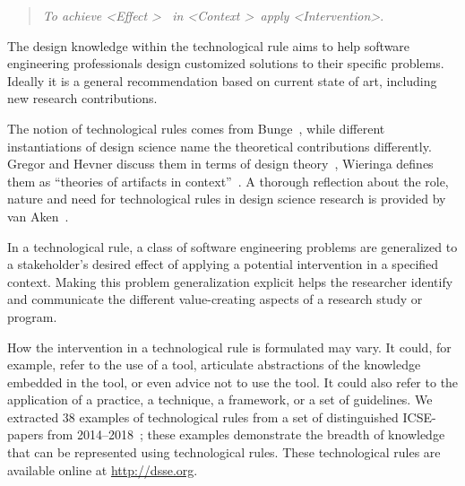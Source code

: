 \documentclass[graybox]{svmult}
\newcommand{\emelie}[1]{\textcolor{red}{{\it [Emelie says: #1]}}}
\newcommand{\peggy}[1]{\textcolor{blue}{{\it [Peggy says: #1]}}}
\newcommand{\per}[1]{\textcolor{cyan}{{\it [Per says: #1]}}}
\newcommand{\emelie}[1]{}
\newcommand{\peggy}[1]{}
\newcommand{\per}[1]{}
\begin{document}
\begin{quote}{\emph{To achieve \textless Effect \textgreater ~ in \textless Context \textgreater~apply \textless Intervention\textgreater}.} 
\end{quote}
The design knowledge within the technological rule aims to help software engineering professionals design customized solutions to their specific problems. Ideally it is a general recommendation based on current state of art, including new research contributions.

The notion of technological rules comes from Bunge~\cite{bunge_philosophy_1998}, while different instantiations of design science name the theoretical contributions differently. Gregor and Hevner discuss them in terms of design theory~\cite{gregor_positioning_2013}, Wieringa defines them as ``theories of artifacts in context''~\cite{wieringa_design_2009}. A thorough reflection about the role, nature and need for  technological rules in design science research is provided by van Aken~\cite{van_aken_management_2004}. 

In a technological rule, a class of software engineering problems are generalized to a stakeholder's desired effect of applying a potential intervention in a specified context. 
Making this problem generalization explicit helps the researcher identify and communicate the different value-creating aspects of a research study or program.

How the intervention in a technological rule is formulated may vary. It could, for example, refer to the use of a tool, articulate abstractions of the knowledge embedded in the tool, or even advice not to use the tool.
 It could also refer to the application of a practice, a technique, a framework, or a set of guidelines. We extracted 38 examples of technological rules from a set of distinguished ICSE-papers from 2014--2018~\cite{Engstrom19arxiv}; these examples demonstrate the breadth of knowledge that can be represented using technological rules. These technological rules are available online at \url{http://dsse.org}.
\end{document}
